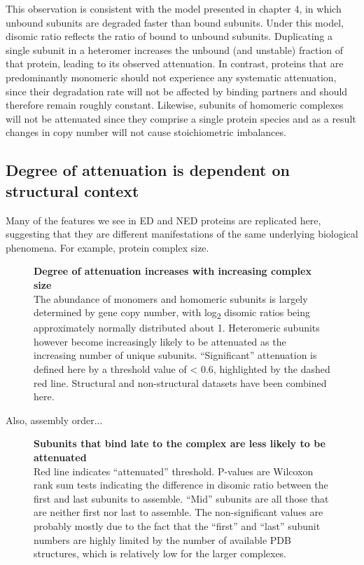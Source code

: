 \documentclass[a4paper,11pt,twoside,openright]{scrbook}
\begin{document}
This observation is consistent with the model presented in chapter 4, in which unbound subunits are degraded faster than bound subunits. Under this model, disomic ratio reflects the ratio of bound to unbound subunits. Duplicating a single subunit in a heteromer increases the unbound (and unstable) fraction of that protein, leading to its observed attenuation. In contrast, proteins that are predominantly monomeric should not experience any systematic attenuation, since their degradation rate will not be affected by binding partners and should therefore remain roughly constant. Likewise, subunits of homomeric complexes will not be attenuated since they comprise a single protein species and as a result changes in copy number will not cause stoichiometric imbalances.

\subsection{Degree of attenuation is dependent on structural context}

Many of the features we see in ED and NED proteins are replicated here, suggesting that they are different manifestations of the same underlying biological phenomena. For example, protein complex size.

\begin{figure}[h]
    \caption[Degree of attenuation increases with increasing complex size]{\sffamily \textbf{Degree of attenuation increases with increasing complex size} \\ \small The abundance of monomers and homomeric subunits is largely determined by gene copy number, with log\textsubscript{2} disomic ratios being approximately normally distributed about 1. Heteromeric subunits however become increasingly likely to be attenuated as the increasing number of unique subunits. “Significant” attenuation is defined here by a threshold value of < 0.6, highlighted by the dashed red line. Structural and non-structural datasets have been combined here.}
    \label{c5f2}
\end{figure}

Also, assembly order...

\begin{figure}[h]
    \caption[Subunits that bind late to the complex are less likely to be attenuated]{\sffamily \textbf{Subunits that bind late to the complex are less likely to be attenuated} \\ \small Red line indicates “attenuated” threshold. P-values are Wilcoxon rank sum tests indicating the difference in disomic ratio between the first and last subunits to assemble. “Mid” subunits are all those that are neither first nor last to assemble. The non-significant values are probably mostly due to the fact that the “first” and “last” subunit numbers are highly limited by the number of available PDB structures, which is relatively low for the larger complexes.}
    \label{c5f3}
\end{figure}
\end{document}
